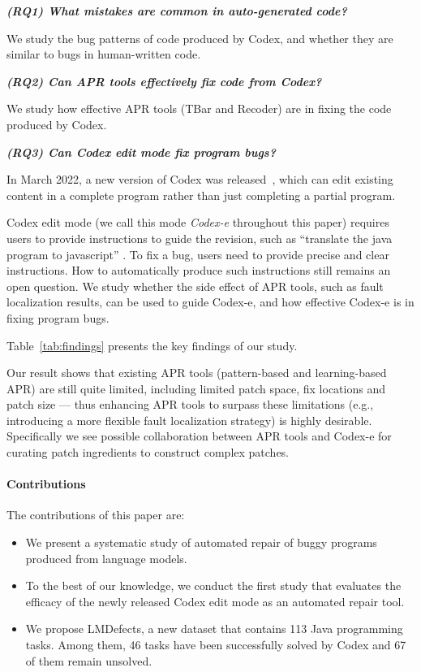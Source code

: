 \smallskip

\textit{\textbf{(RQ1) What mistakes are common in  auto-generated code?}}

We study the bug patterns of code produced by Codex, and whether they are similar to bugs in human-written code. 

\smallskip

\textit{\textbf{(RQ2) Can APR tools effectively fix code from Codex?}}

We study how effective APR tools (TBar and Recoder) are in fixing the code produced by Codex. 

\smallskip

\textit{\textbf{(RQ3) Can Codex edit mode fix program bugs?}}

In March 2022, a new version of Codex was released~\cite{codex-e}, which can edit existing content in a complete program rather than just completing a partial program.

Codex edit mode (we call this mode \textit{Codex-e}  throughout this paper) requires users to provide instructions to guide the revision, such as ``translate the java program to javascript'' \cite{codex-e}. To fix a bug, users need to provide precise and clear instructions. How to automatically produce such instructions still remains an open question. We study whether the side effect of APR tools, such as fault localization results, can be used to guide Codex-e, and how effective Codex-e is in fixing program bugs.

Table~\ref{tab:findings} presents the key findings of our study.

Our result shows that existing APR tools (pattern-based and learning-based APR) are still quite limited, including limited patch space, fix locations and patch size --- thus enhancing APR tools to surpass these limitations (e.g., introducing a more flexible fault localization strategy) is highly desirable. Specifically we see possible collaboration between APR tools and Codex-e for curating patch ingredients to construct complex patches.

\paragraph*{ Contributions} The contributions of this paper are:

\begin{itemize}[leftmargin=*, topsep=0pt]
\item We present a systematic study of automated repair of buggy programs produced from language models.
\item  To the best of our knowledge, we conduct the first study that evaluates the efficacy of the newly released Codex edit mode as an automated repair tool.
\item We propose LMDefects, a new dataset that contains 113 Java programming tasks. Among them, 46 tasks have been successfully solved by Codex and 67 of them remain unsolved. 
\end{itemize}

